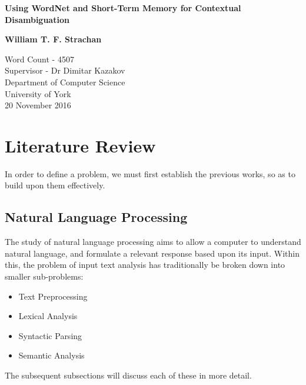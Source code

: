 \documentclass[]{article}
\begin{document}
\begin{titlepage}
    \begin{center}
        \vspace*{1cm}
        
        \Huge
        \textbf{Using WordNet and Short-Term Memory for Contextual Disambiguation}
        \vspace{2cm}
        
        \Large
        \textbf{William T. F. Strachan}
        
        \vfill
                
        \vspace{0.8cm}
        
        \Large
        Word Count - 4507\\
        Supervisor - Dr Dimitar Kazakov\\
        Department of Computer Science\\
        University of York\\
        20 November 2016
        
    \end{center}
\end{titlepage}

\tableofcontents

\newpage

\section{Literature Review}
\label{sec:LitReview}
In order to define a problem, we must first establish the previous works, so as to build upon them effectively. 
		

\subsection{Natural Language Processing}
\label{sec:NLP}
The study of natural language processing aims to allow a computer to understand natural language, and formulate a relevant response based upon its input. Within this, the problem of input text analysis has traditionally be broken down into smaller sub-problems\cite{NLPHandbook}:
\begin{itemize}
	\item Text Preprocessing
	\item Lexical Analysis
	\item Syntactic Parsing
	\item Semantic Analysis
\end{itemize}
The subsequent subsections will discuss each of these in more detail.
\end{document}
